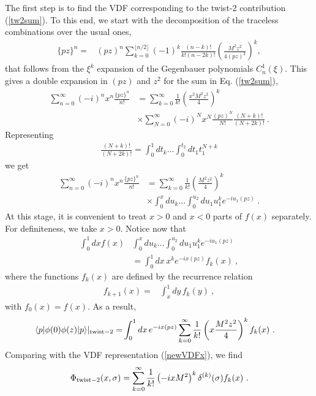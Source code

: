 \documentclass[final,5p,times,twocolumn]{elsarticle}
\newcommand{\nn}{\nonumber \\ }
\begin{document}
The first step is to find the  VDF corresponding to the twist-2 
contribution (\ref{tw2sum}).  
To  this end, we start with      the decomposition 
   of the traceless combinations over the usual ones,
  \begin{align}
    \{pz\}^n =&(pz)^{n } \sum_{k=0}^{\lfloor n/2\rfloor} (-1)^k\frac{(n-k)!}{ k!(n-2k)!} 
    \left ( \frac{M^2 z^2 }{4(pz)^2}\right )^k    ,
   \end{align} 
   that   follows from the $\xi^k$ expansion of the Gegenbauer polynomials $C_n^1 (\xi)$.
   This gives  a double  expansion in  $(pz)$ and $z^2$  for the sum  in Eq.  (\ref{tw2sum}),  
 \begin{align}
 \sum_{n=0}^\infty  
 (-i)^n x^n  \frac{\{pz\}^n}{n!}& =  \sum_{k=0}^\infty\frac{1}{ k!}  \left (\frac{x^2M^2 z^2 }{4}\right )^k \nn & \times  \sum_{N=0}^{\infty }
 (-i)^{N} x^{N}  \frac{(pz)^N} { N!} \frac{(N+k)!}{(N+2k)!} \ .
\end{align}
 Representing 
\begin{align}
\frac{(N+k)!}{(N+2k)!} =\int_0^{1} dt_k  \ldots 
\int_0^{t_2} dt_1 t_1^{N+k}
 \end{align} 
 we get 
 \begin{align}
  \sum_{n=0}^\infty 
 (-i)^n x^n  \frac{\{pz\}^n}{n!}  & =  \sum_{k=0}^\infty\frac{1}{ k!}  \left (\frac{M^2 z^2 }{4}\right )^k 
\nn & \times \int_0^{x} du_k  \ldots 
\int_0^{u_2} du_1 u_1^{k}e^{-iu_1 (pz)}  \  . 
  \end{align} 
  At this stage, it is convenient to treat $x>0$ and $x<0$  parts of $f(x)$ separately.
  For definiteness, we take  $x>0$.  Notice now that 
   \begin{align}
   \int_0^1 dx f(x) & 
\int_0^{x} du_k  \ldots 
\int_0^{u_2} du_1 u_1^{k}e^{-iu_1 (pz)}  \nn &
=
\int_0^1 dx \,x^{k}e^{-ix (pz)} 
f_k (x)\ , 
  \end{align} 
  where the functions $f_k (x)$   are  defined by the recurrence relation
    \begin{align}
f_{k+1} (x) =   & \int_x^1 dy\,  f_k(y)
\ , 
  \end{align} 
  with $f_0 (x) = f(x)$. 
  As a result, 
   \begin{align}
 \langle p |  \phi (0)   \phi(z )|p \rangle |_{\rm twist-2}
=& 
\int_{0}^1 dx\,     e^{-ix (pz)}  \sum_{k=0}^\infty \frac{1}{ k!} \left (x\frac{M^2 z^2 }{4}\right )^k f_k(x) \  . 
 \end{align} 
Comparing with the  VDF representation (\ref{newVDFx}), we find   
   \begin{align}
\Phi_{\rm twist-2}(x, \sigma)= \sum_{k=0}^\infty \frac1{k!}  \left (-i x M^2  \right )^k \delta^{(k)} (\sigma)f_k(x) \  . 
  \label{PhiBox00}
 \end{align}  
 
\end{document}
